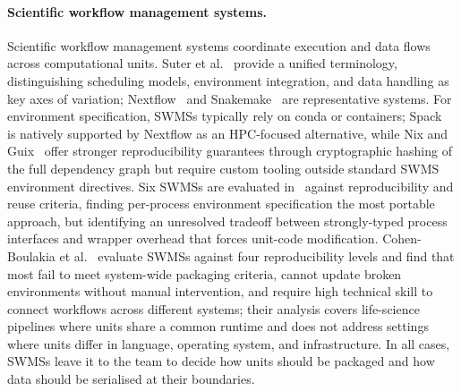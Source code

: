 \documentclass{eceasst}
\begin{document}
\paragraph{Scientific workflow management systems.}
Scientific workflow management systems coordinate execution and data flows
across computational units. Suter et al.~\cite{suter2025terminology} provide a
unified terminology, distinguishing scheduling models, environment integration,
and data handling as key axes of variation; Nextflow~\cite{ditommaso2017nextflow}
and Snakemake~\cite{molder2021snakemake} are representative systems. For
environment specification, SWMSs typically rely on conda or containers;
Spack~\cite{gamblin2015spack} is natively supported by Nextflow as an
HPC-focused alternative, while Nix and Guix~\cite{vallet2022guix} offer
stronger reproducibility guarantees through cryptographic hashing of the full
dependency graph but require custom tooling outside standard SWMS environment
directives.
Six SWMSs are evaluated in~\cite{diercks2023evaluation} against
reproducibility and reuse criteria, finding per-process environment
specification the most portable approach, but identifying an unresolved
tradeoff between strongly-typed process interfaces and wrapper overhead that
forces unit-code modification. Cohen-Boulakia et al.~\cite{cohenboulakia2017workflows}
evaluate SWMSs against four reproducibility levels and find that most fail to
meet system-wide packaging criteria, cannot update broken environments without
manual intervention, and require high technical skill to connect workflows
across different systems; their analysis covers life-science pipelines where
units share a common runtime and does not address settings where units differ
in language, operating system, and infrastructure. In all cases, SWMSs leave
it to the team to decide how units should be packaged and how data should be
serialised at their boundaries.
\end{document}

